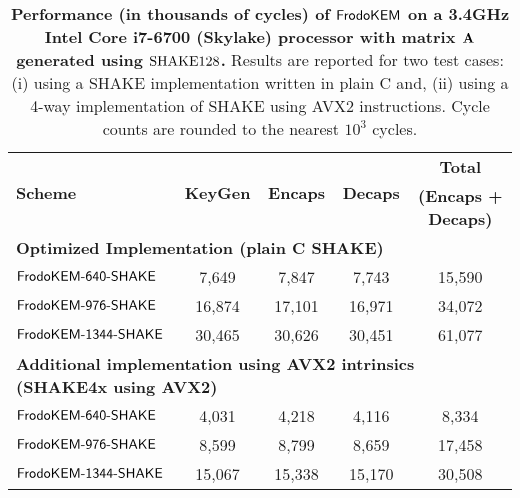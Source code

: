 \begin{table}[t]
\caption{\textbf{Performance (in thousands of cycles) of $\textsf{\upshape\mdseries FrodoKEM}$ on a 3.4GHz Intel Core i7-6700 (Skylake) processor with matrix $\mathbf{A}$ generated using $\textrm{\upshape\mdseries SHAKE}128$.} Results are reported for two test cases: (i) using a SHAKE implementation written in plain C and, (ii) using a 4-way implementation of SHAKE using AVX2 instructions. Cycle counts are rounded to the nearest $10^3$ cycles.}\label{tab:results_x64_shake}
\medskip
\centering
\renewcommand{\tabcolsep}{0.4cm}
\renewcommand{\arraystretch}{1.1}
\begin{tabular}{l|c c c|c}
\toprule
\multirow{2}{*}{\textbf{Scheme}} & \multirow{2}{*}{\textbf{KeyGen}} & \multirow{2}{*}{\textbf{Encaps}} & \multirow{2}{*}{\textbf{Decaps}} & \textbf{Total}             \\ 
                                 &                                  &                                  &                                  & \textbf{(Encaps + Decaps)} \\ 
\midrule
\multicolumn{5}{l}{\bf Optimized Implementation (plain C SHAKE)} \\
\midrule
$\textsf{\upshape\mdseries FrodoKEM-640-SHAKE}$            &           7,649                  &           7,847                  &                7,743             &              15,590        \\
$\textsf{\upshape\mdseries FrodoKEM-976-SHAKE}$          &          16,874                  &          17,101                  &               16,971           &              34,072        \\
$\textsf{\upshape\mdseries FrodoKEM-1344-SHAKE}$          &          30,465                  &          30,626                  &               30,451             &              61,077        \\
\midrule
\multicolumn{5}{l}{\bf Additional implementation using AVX2 intrinsics (SHAKE4x using AVX2)} \\
\midrule
$\textsf{\upshape\mdseries FrodoKEM-640-SHAKE}$            &           4,031                  &           4,218                  &                4,116             &               8,334        \\
$\textsf{\upshape\mdseries FrodoKEM-976-SHAKE}$          &           8,599                  &           8,799                  &                8,659             &              17,458        \\
$\textsf{\upshape\mdseries FrodoKEM-1344-SHAKE}$          &          15,067                  &          15,338                  &               15,170             &              30,508        \\
\bottomrule
\end{tabular}
\end{table}
\fi

